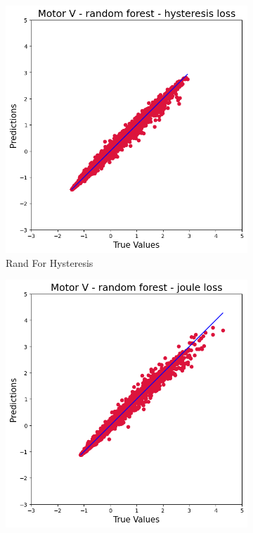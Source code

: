 \documentclass{article}
\begin{document}
\begin{figure}[!htbp]
    \begin{subfigure}[b]{0.23\textwidth}
        \centering
        \includegraphics[width=\textwidth]{images/V/rand_for_hysteresis.png}
        \caption{Rand For Hysteresis}
    \end{subfigure}
    \hfill
    \begin{subfigure}[b]{0.23\textwidth}
        \centering
        \includegraphics[width=\textwidth]{images/V/rand_for_joule.png}

\end{subfigure}
\end{figure}
\end{document}
